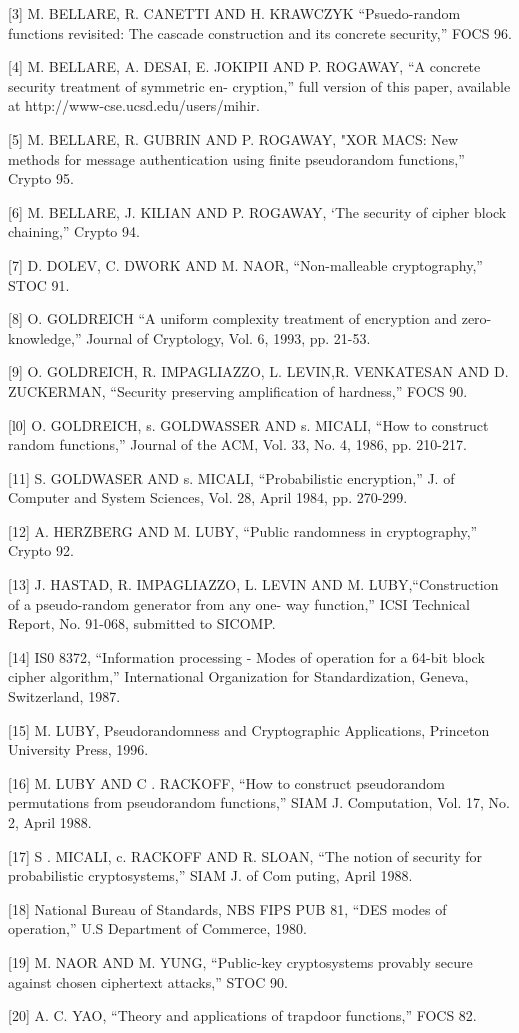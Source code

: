 \documentclass[]{article}
\begin{document}
[3] M. BELLARE, R. CANETTI AND H. KRAWCZYK “Psuedo-random functions revisited: The cascade construction and
its concrete security,” FOCS 96.

[4] M. BELLARE, A. DESAI, E. JOKIPII AND P. ROGAWAY, “A concrete security treatment of symmetric en-
cryption,” full version of this paper, available at http://www-cse.ucsd.edu/users/mihir.

[5] M. BELLARE, R. GUBRIN AND P. ROGAWAY, "XOR MACS: New methods for message authentication using finite pseudorandom functions,” Crypto 95.

[6] M. BELLARE, J. KILIAN AND P. ROGAWAY, ‘The security of cipher block chaining,” Crypto 94.

[7] D. DOLEV, C. DWORK AND M. NAOR, “Non-malleable cryptography,” STOC 91.

[8] O. GOLDREICH “A uniform complexity treatment of encryption and zero-knowledge,” Journal of Cryptology,
Vol. 6, 1993, pp. 21-53.

[9] O. GOLDREICH, R. IMPAGLIAZZO, L. LEVIN,R. VENKATESAN AND D. ZUCKERMAN, “Security preserving amplification of hardness,” FOCS 90.

[l0] O. GOLDREICH, s. GOLDWASSER AND s. MICALI, “How to construct random functions,” Journal of the ACM,
Vol. 33, No. 4, 1986, pp. 210-217.

[11] S. GOLDWASER AND s. MICALI, “Probabilistic encryption,” J. of Computer and System Sciences, Vol. 28,
April 1984, pp. 270-299.

[12] A. HERZBERG AND M. LUBY, “Public randomness in cryptography,” Crypto 92.

[13] J. HASTAD, R. IMPAGLIAZZO, L. LEVIN AND M. LUBY,“Construction of a pseudo-random generator from any one-
way function,” ICSI Technical Report, No. 91-068, submitted to SICOMP.

[14] IS0 8372, “Information processing - Modes of operation for a 64-bit block cipher algorithm,” International Organization for Standardization, Geneva, Switzerland, 1987.

[15] M. LUBY, Pseudorandomness and Cryptographic Applications, Princeton University Press, 1996.

[16] M. LUBY AND C . RACKOFF, “How to construct pseudorandom permutations from pseudorandom functions,”
SIAM J. Computation, Vol. 17, No. 2, April 1988.

[17] S . MICALI, c. RACKOFF AND R. SLOAN, “The notion of security for probabilistic cryptosystems,” SIAM J. of Com
puting, April 1988.

[18] National Bureau of Standards, NBS FIPS PUB 81, “DES modes of operation,” U.S Department of Commerce, 1980.

[19] M. NAOR AND M. YUNG, “Public-key cryptosystems provably secure against chosen ciphertext attacks,”
STOC 90.

[20] A. C. YAO, “Theory and applications of trapdoor functions,” FOCS 82.
\end{document}
